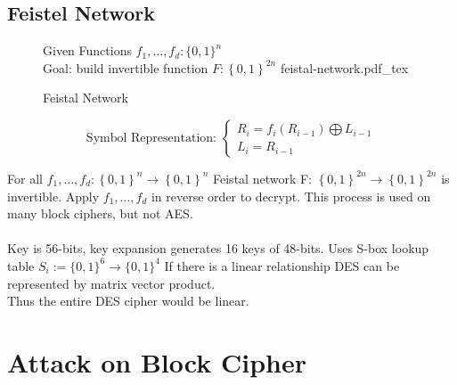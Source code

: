 \documentclass[a4paper]{article}
\newcommand{\incfig}[1]{%
	\def\svgwidth{\columnwidth}
	{#1.pdf_tex}
}
\begin{document}
	\subsection{Feistel Network}
\begin{figure}[h]
	\centering 
   Given Functions $f_1, \ldots, f_d: \{0,1\}^{n}$\\
   Goal: build invertible function $F:\left\{ 0,1 \right\}^{2n} $
   \centering
   \incfig{feistal-network}
   \caption{Feistal Network}
   \label{fig:feistal-network}
\end{figure}

\begin{equation*}
	\text{Symbol Representation: }
	\begin{cases}
		R_i = f_i\left( R_{i-1} \right) \bigoplus L_{i-1}\\
		L_i = R_{i-1}
	\end{cases}
\end{equation*}

	For all $f_1, \ldots, f_d: \left\{ 0,1 \right\}^{n} \to  \left\{ 0,1 \right\}^{n} $
	Feistal network F: $\left\{ 0,1 \right\}^{2n} \to  \left\{ 0,1 \right\}^{2n} $ is invertible.
	Apply $f_1,\ldots,f_d$ in reverse order to decrypt. This process is used on
	many block ciphers, but not AES.\\\\
	Key is 56-bits, key expansion generates 16 keys of 48-bits.
	Uses S-box lookup table $S_i := \{0,1\}^{6} \to \{0,1\}^{4}$ 
	If there is a linear relationship DES can be represented by matrix vector product.\\
	Thus the entire DES cipher would be linear.


	\section{Attack on Block Cipher}
\end{document}

